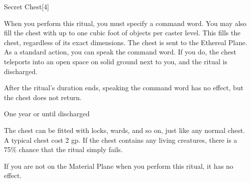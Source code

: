 \begin{spellsection}{Secret Chest}[4]
    \begin{spellheader}
    \end{spellheader}
    \begin{spellcontent}
        \begin{spelltargetinginfo}
        \end{spelltargetinginfo}
        \begin{spelleffects}

            \spellspecial When you perform this ritual, you must specify a command word. You may also fill the chest with up to one cubic foot of objects per caster level. This fills the chest, regardless of its exact dimensions.
            \spellline
            \spelleffect The chest is sent to the Ethereal Plane. As a standard action, you can speak the command word. If you do, the chest teleports into an open space on solid ground next to you, and the ritual is discharged.

            After the ritual's duration ends, speaking the command word has no effect, but the chest does not return.

            \spelldur One year or until discharged
        \end{spelleffects}
    \end{spellcontent}
    \begin{spellfooter}
        \spellnotes The chest can be fitted with locks, wards, and so on, just like any normal chest. A typical chest cost 2 gp. If the chest contains any living creatures, there is a 75\% chance that the ritual simply fails.

        If you are not on the Material Plane when you perform this ritual, it has no effect.
    \end{spellfooter}
\end{spellsection}

